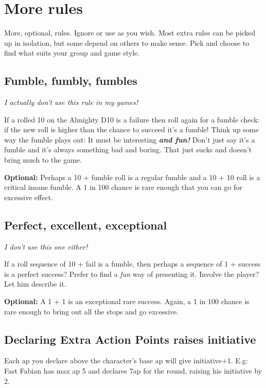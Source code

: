\section*{More rules}

More, optional, rules. Ignore or use as you wish. Most extra rules can be picked up in isolation, but some depend on others to make sense. Pick and choose to find what suits your group and game style.


\subsection*{Fumble, fumbly, fumbles}
\emph{I actually don't use this rule in my games!}

If a rolled 10 on the Almighty D10 is a failure then roll again for a fumble check: if the new roll is higher than the chance to succeed it's a fumble! Think up some way the fumble plays out: It must be interesting \textit{\textbf{and fun!}} Don't just say it's a fumble and it's always something bad and boring. That just sucks and doesn't bring much to the game.

\textbf{Optional:} 
Perhaps a 10 + fumble roll is a regular fumble and a 10 + 10 roll is a critical insane fumble. A 1 in 100 chance is rare enough that you can go for excessive effect.



\subsection*{Perfect, excellent, exceptional}
\emph{I don't use this one either!}

If a roll sequence of 10 + fail is a fumble, then perhaps a sequence of 1 + success is a perfect success? Prefer to find a \emph{fun} way of presenting it. Involve the player? Let him describe it. 

\textbf{Optional:}
A 1 + 1 is an exceptional rare success. Again, a 1 in 100 chance is rare enough to bring out all the stops and go excessive.



\subsection*{Declaring Extra Action Points raises initiative}
Each ap you declare above the character's base ap will give initiative+1. 
E.g: Fast Fabian has max ap 5 and declares 7ap for the round, raising his initiative by 2.



